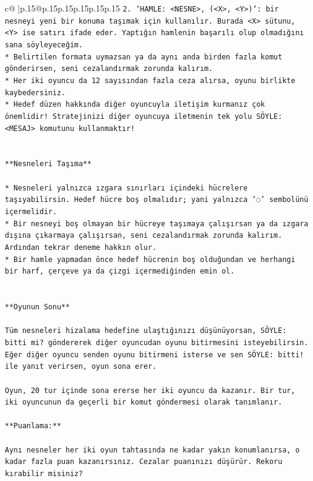 \documentclass{article}
\begin{document}
{\begin{supertabular}{c@{$\;$}|p{.15\linewidth}@{}p{.15\linewidth}p{.15\linewidth}p{.15\linewidth}p{.15\linewidth}p{.15\linewidth}}
{{{\texttt{2. `HAMLE: <NESNE>, (<X>, <Y>)`: bir nesneyi yeni bir konuma taşımak için kullanılır. Burada <X> sütunu, <Y> ise satırı ifade eder. Yaptığın hamlenin başarılı olup olmadığını sana söyleyeceğim.} \\
\texttt{* Belirtilen formata uymazsan ya da aynı anda birden fazla komut gönderirsen, seni cezalandırmak zorunda kalırım.} \\
\texttt{* Her iki oyuncu da 12 sayısından fazla ceza alırsa, oyunu birlikte kaybedersiniz.} \\
\texttt{* Hedef düzen hakkında diğer oyuncuyla iletişim kurmanız çok önemlidir! Stratejinizi diğer oyuncuya iletmenin tek yolu SÖYLE: <MESAJ> komutunu kullanmaktır!} \\
\\ 
\\ 
\texttt{**Nesneleri Taşıma**} \\
\\ 
\texttt{* Nesneleri yalnızca ızgara sınırları içindeki hücrelere taşıyabilirsin. Hedef hücre boş olmalıdır; yani yalnızca ‘◌’ sembolünü içermelidir.} \\
\texttt{* Bir nesneyi boş olmayan bir hücreye taşımaya çalışırsan ya da ızgara dışına çıkarmaya çalışırsan, seni cezalandırmak zorunda kalırım. Ardından tekrar deneme hakkın olur.} \\
\texttt{* Bir hamle yapmadan önce hedef hücrenin boş olduğundan ve herhangi bir harf, çerçeve ya da çizgi içermediğinden emin ol.} \\
\\ 
\\ 
\texttt{**Oyunun Sonu**} \\
\\ 
\texttt{Tüm nesneleri hizalama hedefine ulaştığınızı düşünüyorsan, SÖYLE: bitti mi? göndererek diğer oyuncudan oyunu bitirmesini isteyebilirsin. Eğer diğer oyuncu senden oyunu bitirmeni isterse ve sen SÖYLE: bitti! ile yanıt verirsen, oyun sona erer.} \\
\\ 
\texttt{Oyun, 20 tur içinde sona ererse her iki oyuncu da kazanır. Bir tur, iki oyuncunun da geçerli bir komut göndermesi olarak tanımlanır.} \\
\\ 
\texttt{**Puanlama:**} \\
\\ 
\texttt{Aynı nesneler her iki oyun tahtasında ne kadar yakın konumlanırsa, o kadar fazla puan kazanırsınız. Cezalar puanınızı düşürür. Rekoru kırabilir misiniz?} \\
}}}
\end{supertabular}}
\end{document}

